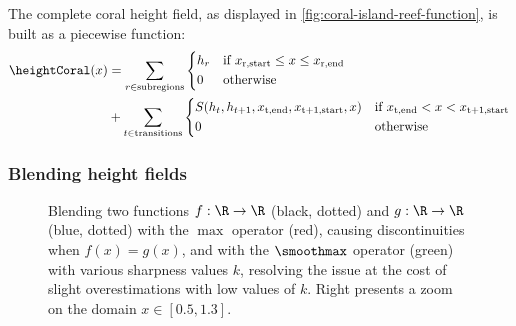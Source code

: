 The complete coral height field, as displayed in \cref{fig:coral-island-reef-function}, is built as a piecewise function:
\begin{align}
    \label{eq:coral-island-full-reef-function}
    \heightCoral(x) &= \sum_{r \in \text{subregions}}{
    \begin{dcases}
        h_r & \text{if } x_{\text{r,start}} \leq x \leq x_{\text{r,end}} \\
        0 & \text{otherwise}
    \end{dcases}
    } \nonumber \\
    &+
    \sum_{t \in \text{transitions}} {
    \begin{dcases}
        S(h_{t}, h_{t+1}, x_{\text{t,end}}, x_{\text{t+1,start}}, x) & \text{if } x_{\text{t,end}} < x < x_{\text{t+1,start}} \\
        0 & \text{otherwise}
    \end{dcases}
    }
\end{align}

\subsubsection{Blending height fields}
\label{subsubsec:height-functions-blending}

\begin{figure}[H]
    \caption{Blending two functions $f: \R \to \R$ (black, dotted) and $g: \R \to \R$ (blue, dotted) with the $\max$ operator (red), causing discontinuities when $f(x)=g(x)$, and with the $\smoothmax$ operator (green) with various sharpness values $k$, resolving the issue at the cost of slight overestimations with low values of $k$. Right presents a zoom on the domain $x \in [0.5, 1.3]$. }
    \label{fig:coral-island-blend-function-island}
\end{figure}

